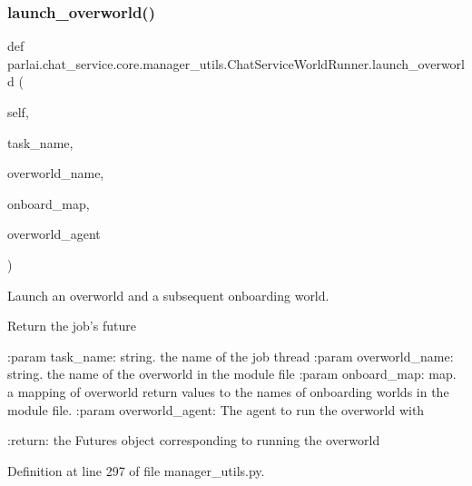 \subsubsection{\texorpdfstring{launch\+\_\+overworld()}{launch\_overworld()}}
{\footnotesize\ttfamily def parlai.\+chat\+\_\+service.\+core.\+manager\+\_\+utils.\+Chat\+Service\+World\+Runner.\+launch\+\_\+overworld (\begin{DoxyParamCaption}\item[{}]{self,  }\item[{}]{task\+\_\+name,  }\item[{}]{overworld\+\_\+name,  }\item[{}]{onboard\+\_\+map,  }\item[{}]{overworld\+\_\+agent }\end{DoxyParamCaption})}

\begin{DoxyVerb}Launch an overworld and a subsequent onboarding world.

Return the job's future

:param task_name:
    string. the name of the job thread
:param overworld_name:
    string. the name of the overworld in the module file
:param onboard_map:
    map. a mapping of overworld return values to the names
    of onboarding worlds in the module file.
:param overworld_agent:
    The agent to run the overworld with

:return:
    the Futures object corresponding to running the overworld
\end{DoxyVerb}
 

Definition at line 297 of file manager\+\_\+utils.\+py.


